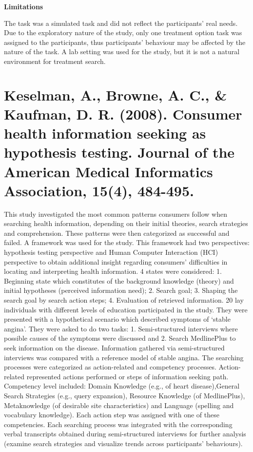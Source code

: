 \documentclass[]{article}
\begin{document}
\textbf{Limitations}

The task was a simulated task and did not reflect the participants’ real needs. Due to the exploratory nature of the study, only one treatment option task was assigned to the participants, thus participants’ behaviour may be affected by the nature of the task. A lab setting was used for the study, but it is not a natural environment for treatment search.  

\section{Keselman, A., Browne, A. C., \& Kaufman, D. R. (2008). Consumer health information seeking as hypothesis testing. Journal of the American Medical Informatics Association, 15(4), 484-495.} 

This study investigated the most common patterns consumers follow when searching health information, depending on their initial theories, search strategies and comprehension. These patterns were then categorized as successful and failed. A framework was used for the study. This framework had two perspectives: hypothesis testing perspective and Human Computer Interaction (HCI) perspective to obtain additional insight regarding consumers’ difficulties in locating and interpreting health information. 4 states were considered: 1. Beginning state which constitutes of the background knowledge (theory) and initial hypotheses (perceived information need); 2. Search goal; 3. Shaping the search goal by search action steps; 4. Evaluation of retrieved information. 20 lay individuals with different levels of education participated in the study. They were presented with a hypothetical scenario which described symptoms of ‘stable angina’. They were asked to do two tasks: 1. Semi-structured interviews where possible causes of the symptoms were discussed and 2. Search MedlinePlus to seek information on the disease. Information gathered via semi-structured interviews was compared with a reference model of stable angina. The searching processes were categorized as action-related and competency processes. Action-related represented actions performed or steps of information seeking path. Competency level included: Domain Knowledge (e.g., of heart disease),General Search Strategies (e.g., query expansion), Resource Knowledge (of MedlinePlus), Metaknowledge (of desirable site characteristics) and Language (spelling and vocabulary knowledge). Each action step was assigned with one of these competencies. Each searching process was integrated with the corresponding verbal transcripts obtained during semi-structured interviews for further analysis (examine search strategies and visualize trends across participants’ behaviours). 
\end{document}
